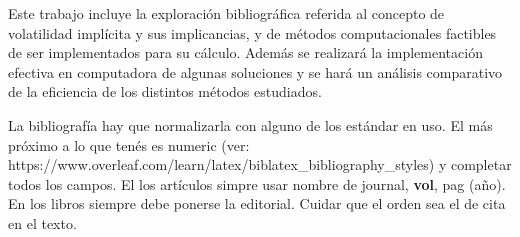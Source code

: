 \documentclass[a4paper,openright, 12pt, oneside]{book}
\begin{document}
\vspace{5mm}

Este trabajo incluye la exploración bibliográfica referida al concepto de volatilidad implícita y sus implicancias, y de métodos computacionales factibles de ser implementados para su cálculo. Además se realizará la implementación efectiva en computadora de algunas soluciones y se hará un análisis comparativo de la eficiencia de los distintos métodos estudiados.




\tableofcontents

















{\color{red} La bibliografía hay que normalizarla con alguno de los estándar en uso. El más próximo a lo que tenés es numeric (ver: https://www.overleaf.com/learn/latex/biblatex_bibliography_styles) y completar todos los campos. El los artículos simpre usar nombre de journal, {\bf vol}, pag (año). En los libros siempre debe ponerse la editorial. Cuidar que el orden sea el de cita en el texto.}
\end{document}
